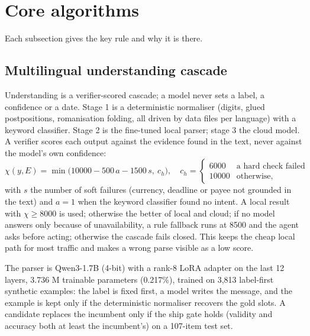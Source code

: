 \documentclass[11pt,a4paper]{article}
\begin{document}
\section{Core algorithms}\label{sec:alg}
Each subsection gives the key rule and why it is there.

\subsection{Multilingual understanding cascade}
Understanding is a verifier-scored cascade; a model never sets a label, a confidence or a date. Stage 1 is a deterministic normaliser (digits, glued postpositions, romanisation folding, all driven by data files per language) with a keyword classifier. Stage 2 is the fine-tuned local parser; stage 3 the cloud model. A verifier scores each output against the evidence found in the text, never against the model's own confidence:
\begin{equation*}
\chi(y,E)=\min\bigl(10000-500\,a-1500\,s,\ c_h\bigr),\quad c_h=\begin{cases}6000&\text{a hard check failed}\\10000&\text{otherwise,}\end{cases}
\end{equation*}
with $s$ the number of soft failures (currency, deadline or payee not grounded in the text) and $a=1$ when the keyword classifier found no intent. A local result with $\chi\ge8000$ is used; otherwise the better of local and cloud; if no model answers only because of unavailability, a rule fallback runs at 8500 and the agent asks before acting; otherwise the cascade fails closed. This keeps the cheap local path for most traffic and makes a wrong parse visible as a low score.

The parser is Qwen3-1.7B (4-bit) with a rank-8 LoRA adapter on the last 12 layers, 3.736 M trainable parameters (0.217\%), trained on 3,813 label-first synthetic examples: the label is fixed first, a model writes the message, and the example is kept only if the deterministic normaliser recovers the gold slots. A candidate replaces the incumbent only if the ship gate holds (validity and accuracy both at least the incumbent's) on a 107-item test set.
\end{document}
